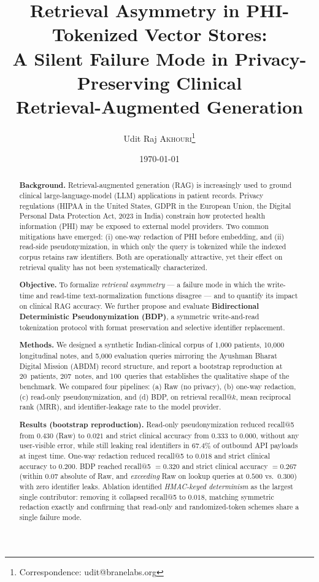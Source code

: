 \documentclass[11pt,a4paper]{article}
\title{\textbf{Retrieval Asymmetry in PHI-Tokenized Vector Stores:\\
A Silent Failure Mode in Privacy-Preserving Clinical\\ Retrieval-Augmented Generation}}
\author[1]{Udit Raj \textsc{Akhouri}\thanks{Correspondence: udit@branelabs.org}}
\affil[1]{Brane Labs, Bengaluru, India}
\date{\today}
\begin{document}
\maketitle

\begin{abstract}
\noindent
\textbf{Background.} Retrieval-augmented generation (RAG) is increasingly
used to ground clinical large-language-model (LLM) applications in patient
records. Privacy regulations (HIPAA in the United States, GDPR in the
European Union, the Digital Personal Data Protection Act, 2023 in India)
constrain how protected health information (PHI) may be exposed to external
model providers. Two common mitigations have emerged: (i) one-way redaction
of PHI before embedding, and (ii) read-side pseudonymization, in which only
the query is tokenized while the indexed corpus retains raw identifiers.
Both are operationally attractive, yet their effect on retrieval quality has
not been systematically characterized.

\textbf{Objective.} To formalize \emph{retrieval asymmetry} --- a failure
mode in which the write-time and read-time text-normalization functions
disagree --- and to quantify its impact on clinical RAG accuracy. We
further propose and evaluate \textbf{Bidirectional Deterministic
Pseudonymization (BDP)}, a symmetric write-and-read tokenization protocol
with format preservation and selective identifier replacement.

\textbf{Methods.} We designed a synthetic Indian-clinical corpus of
1{,}000 patients, 10{,}000 longitudinal notes, and 5{,}000 evaluation
queries mirroring the Ayushman Bharat Digital Mission (ABDM) record
structure, and report a bootstrap reproduction at 20~patients,
207~notes, and 100~queries that establishes the qualitative shape of the
benchmark. We compared four pipelines: (a) Raw (no privacy), (b) one-way
redaction, (c) read-only pseudonymization, and (d) BDP, on retrieval
recall@$k$, mean reciprocal rank (MRR), and identifier-leakage rate to the
model provider.

\textbf{Results (bootstrap reproduction).} Read-only pseudonymization
reduced recall@5 from $0.430$ (Raw) to $0.021$ and strict clinical
accuracy from $0.333$ to $0.000$, without any user-visible error, while
still leaking real identifiers in $67.4\%$ of outbound API payloads at
ingest time. One-way redaction reduced recall@5 to $0.018$ and strict
clinical accuracy to $0.200$. BDP reached recall@5 $=0.320$ and strict
clinical accuracy $=0.267$ (within $0.07$ absolute of Raw, and
\emph{exceeding} Raw on lookup queries at $0.500$ vs.\ $0.300$) with zero
identifier leaks. Ablation identified \emph{HMAC-keyed determinism} as the
largest single contributor: removing it collapsed recall@5 to $0.018$,
matching symmetric redaction exactly and confirming that read-only and
randomized-token schemes share a single failure mode.


\end{abstract}
\end{document}
